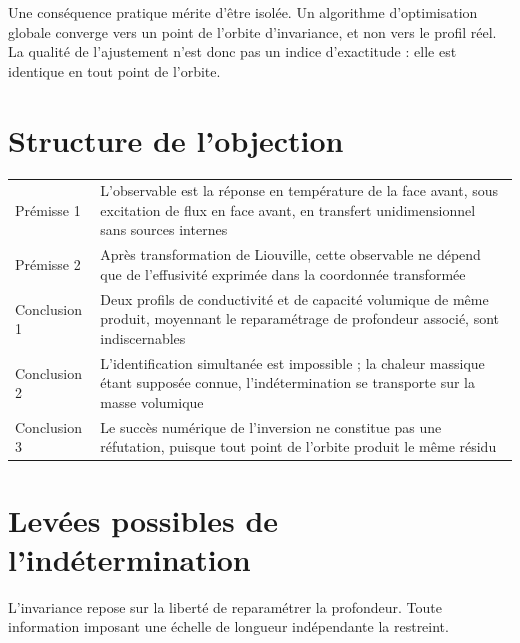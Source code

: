 \documentclass[11pt,a4paper]{article}
\begin{document}
Une conséquence pratique mérite d'être isolée. Un algorithme d'optimisation globale converge vers un
point de l'orbite d'invariance, et non vers le profil réel. La qualité de l'ajustement n'est donc pas un
indice d'exactitude : elle est identique en tout point de l'orbite.

\section{Structure de l'objection}

\begin{center}
\begin{tabularx}{\textwidth}{@{}lX@{}}
\toprule
Prémisse 1 & L'observable est la réponse en température de la face avant, sous excitation de flux en
face avant, en transfert unidimensionnel sans sources internes \\
\addlinespace
Prémisse 2 & Après transformation de Liouville, cette observable ne dépend que de l'effusivité exprimée
dans la coordonnée transformée \\
\addlinespace
Conclusion 1 & Deux profils de conductivité et de capacité volumique de même produit, moyennant le
reparamétrage de profondeur associé, sont indiscernables \\
\addlinespace
Conclusion 2 & L'identification simultanée est impossible ; la chaleur massique étant supposée connue,
l'indétermination se transporte sur la masse volumique \\
\addlinespace
Conclusion 3 & Le succès numérique de l'inversion ne constitue pas une réfutation, puisque tout point de
l'orbite produit le même résidu \\
\bottomrule
\end{tabularx}
\end{center}

\section{Levées possibles de l'indétermination}

L'invariance repose sur la liberté de reparamétrer la profondeur. Toute information imposant une échelle
de longueur indépendante la restreint.
\end{document}

